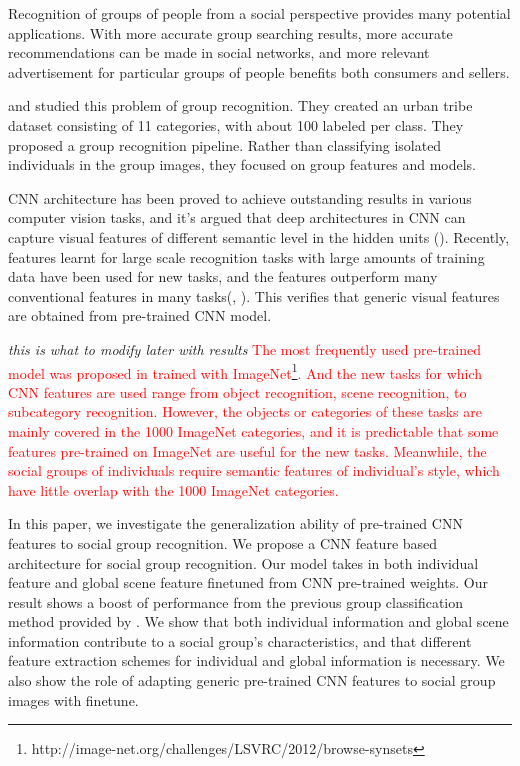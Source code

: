 \documentclass[10pt,twocolumn,letterpaper]{article}
\begin{document}
Recognition of groups of people from a social perspective provides many potential applications.  With more accurate group searching results, more accurate recommendations can be made in social networks, and more relevant advertisement for particular groups of people benefits both consumers and sellers.

\cite{urbantribe} and \cite{urbantribe2} studied this problem of group recognition. They created an urban tribe dataset consisting of 11 categories, with about 100 labeled per class.  They proposed a group recognition pipeline. Rather than classifying isolated individuals in the group images, they focused on group features and models.

CNN architecture has been proved to achieve outstanding results in various computer vision tasks, and it's argued that deep architectures in CNN can capture visual features of different semantic level in the hidden units (\cite{Imagenet13}). Recently, features learnt for large scale recognition tasks with large amounts of training data have been used for new tasks, and the features outperform many conventional features in many tasks(\cite{Imagenet13}, \cite{decaf}). This verifies that generic visual features are obtained from pre-trained CNN model. 

\emph{this is what to modify later with results}
\textcolor{red} {The most frequently used pre-trained model was proposed in \cite{Imagenet} trained with ImageNet\footnote{http://image-net.org/challenges/LSVRC/2012/browse-synsets}. And the new tasks for which CNN features are used range from object recognition, scene recognition, to subcategory recognition. However, the objects or categories of these tasks are mainly covered in the 1000 ImageNet categories, and it is predictable that some features pre-trained on ImageNet are useful for the new tasks. Meanwhile, the social groups of individuals require semantic features of individual's style, which have little overlap with the 1000 ImageNet categories.}




In this paper, we investigate the generalization ability of pre-trained CNN features to social group recognition.
We propose a CNN feature based architecture for social group recognition. Our model takes in both individual feature and global scene feature finetuned from CNN pre-trained weights. Our result shows a boost of performance from the previous group classification method provided by \cite{urbantribe2}. We show that both individual information and global scene information contribute to a social group's characteristics, and that different feature extraction schemes for individual and global information is necessary. We also show the role of adapting generic pre-trained CNN features to social group images with finetune. 
\end{document}
